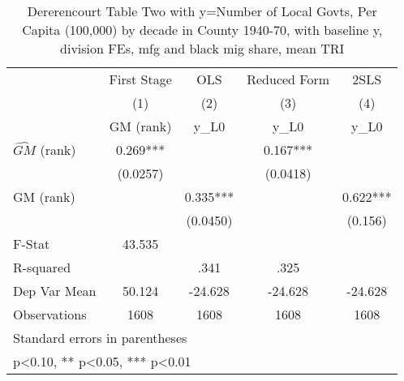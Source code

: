 \begin{table}[htbp]\centering
\def\sym#1{\ifmmode^{#1}\else\(^{#1}\)\fi}
\caption{Dererencourt Table Two with y=Number of Local Govts, Per Capita (100,000) by decade in County 1940-70, with baseline y, division FEs, mfg and black mig share, mean TRI}
\begin{tabular}{l*{4}{c}}
\toprule
                    & First Stage   &         OLS   &Reduced Form   &        2SLS   \\
                    &\multicolumn{1}{c}{(1)}&\multicolumn{1}{c}{(2)}&\multicolumn{1}{c}{(3)}&\multicolumn{1}{c}{(4)}\\
                    &\multicolumn{1}{c}{GM  (rank)}&\multicolumn{1}{c}{y\_L0}&\multicolumn{1}{c}{y\_L0}&\multicolumn{1}{c}{y\_L0}\\
\midrule
$\hat{GM}$ (rank)   &       0.269***&               &       0.167***&               \\
                    &    (0.0257)   &               &    (0.0418)   &               \\
\addlinespace
GM  (rank)          &               &       0.335***&               &       0.622***\\
                    &               &    (0.0450)   &               &     (0.156)   \\
\midrule
F-Stat              &      43.535   &               &               &               \\
R-squared           &               &        .341   &        .325   &               \\
Dep Var Mean        &      50.124   &     -24.628   &     -24.628   &     -24.628   \\
Observations        &        1608   &        1608   &        1608   &        1608   \\
\bottomrule
\multicolumn{5}{l}{\footnotesize Standard errors in parentheses}\\
\multicolumn{5}{l}{\footnotesize * p<0.10, ** p<0.05, *** p<0.01}\\
\end{tabular}
\end{table}
